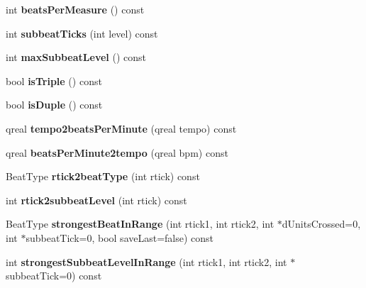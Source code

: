 \begin{DoxyCompactItemize}
int {\bfseries beats\+Per\+Measure} () const
\item 
\mbox{\label{class_ms_1_1_time_sig_frac_a95bee3ae6611c2e09242558ef004d198}} 
int {\bfseries subbeat\+Ticks} (int level) const
\item 
\mbox{\label{class_ms_1_1_time_sig_frac_ad2e058e50760ad54f558d843228468a8}} 
int {\bfseries max\+Subbeat\+Level} () const
\item 
\mbox{\label{class_ms_1_1_time_sig_frac_a6da0e935eccfb7fc49a4e5331ad6600d}} 
bool {\bfseries is\+Triple} () const
\item 
\mbox{\label{class_ms_1_1_time_sig_frac_ae65331a74a41651a285c873b2a315669}} 
bool {\bfseries is\+Duple} () const
\item 
\mbox{\label{class_ms_1_1_time_sig_frac_acfbecbde3a454df3a672952ca1c1e622}} 
qreal {\bfseries tempo2beats\+Per\+Minute} (qreal tempo) const
\item 
\mbox{\label{class_ms_1_1_time_sig_frac_ab28c52140cc9188083c6f7ccb24fe81f}} 
qreal {\bfseries beats\+Per\+Minute2tempo} (qreal bpm) const
\item 
\mbox{\label{class_ms_1_1_time_sig_frac_af08c68c5d267082fbbadd339b7904314}} 
Beat\+Type {\bfseries rtick2beat\+Type} (int rtick) const
\item 
\mbox{\label{class_ms_1_1_time_sig_frac_a45c3f5a98b5f973d99cb2dba5716397a}} 
int {\bfseries rtick2subbeat\+Level} (int rtick) const
\item 
\mbox{\label{class_ms_1_1_time_sig_frac_a7bd1396fddad56ce2fa18b0314903a87}} 
Beat\+Type {\bfseries strongest\+Beat\+In\+Range} (int rtick1, int rtick2, int $\ast$d\+Units\+Crossed=0, int $\ast$subbeat\+Tick=0, bool save\+Last=false) const
\item 
\mbox{\label{class_ms_1_1_time_sig_frac_a902468235a40137f211987182b97effd}} 
int {\bfseries strongest\+Subbeat\+Level\+In\+Range} (int rtick1, int rtick2, int $\ast$subbeat\+Tick=0) const

\end{DoxyCompactItemize}
